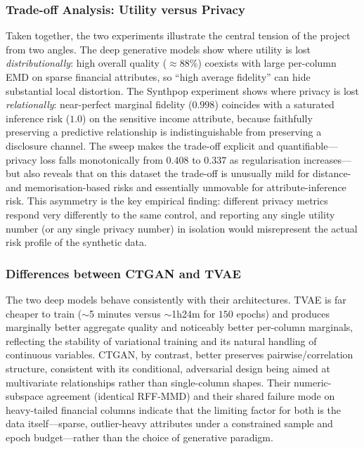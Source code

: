 \documentclass[11pt]{article}
\begin{document}
\subsubsection{Trade-off Analysis: Utility versus Privacy}

Taken together, the two experiments illustrate the central tension of the project from two angles. The deep generative models show where utility is lost \emph{distributionally}: high overall quality ($\approx 88\%$) coexists with large per-column EMD on sparse financial attributes, so ``high average fidelity'' can hide substantial local distortion. The Synthpop experiment shows where privacy is lost \emph{relationally}: near-perfect marginal fidelity ($0.998$) coincides with a saturated inference risk ($1.0$) on the sensitive income attribute, because faithfully preserving a predictive relationship is indistinguishable from preserving a disclosure channel. The sweep makes the trade-off explicit and quantifiable---privacy loss falls monotonically from $0.408$ to $0.337$ as regularisation increases---but also reveals that on this dataset the trade-off is unusually mild for distance- and memorisation-based risks and essentially unmovable for attribute-inference risk. This asymmetry is the key empirical finding: different privacy metrics respond very differently to the same control, and reporting any single utility number (or any single privacy number) in isolation would misrepresent the actual risk profile of the synthetic data.

\subsubsection{Differences between CTGAN and TVAE}

The two deep models behave consistently with their architectures. TVAE is far cheaper to train ($\sim$5 minutes versus $\sim$1h24m for $150$ epochs) and produces marginally better aggregate quality and noticeably better per-column marginals, reflecting the stability of variational training and its natural handling of continuous variables. CTGAN, by contrast, better preserves pairwise/correlation structure, consistent with its conditional, adversarial design being aimed at multivariate relationships rather than single-column shapes. Their numeric-subspace agreement (identical RFF-MMD) and their shared failure mode on heavy-tailed financial columns indicate that the limiting factor for both is the data itself---sparse, outlier-heavy attributes under a constrained sample and epoch budget---rather than the choice of generative paradigm.
\end{document}
